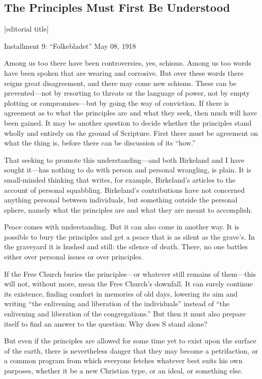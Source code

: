 

\subsection{The Principles Must First Be Understood} 
[editorial title]

Installment 9: “Folkebladet” May 08, 1918

Among us too there have been controversies, yes, schisms. Among us too words have been spoken that are wearing and corrosive. But over these words there reigns great disagreement, and there may come new schisms. These can be prevented—not by resorting to threats or the language of power, not by empty plotting or compromises—but by going the way of conviction. If there is agreement as to what the principles are and what they seek, then much will have been gained. It may be another question to decide whether the principles stand wholly and entirely on the ground of Scripture. First there must be agreement on what the thing is, before there can be discussion of its “how.”

That seeking to promote this understanding—and both Birkeland and I have sought it—has nothing to do with person and personal wrangling, is plain. It is small-minded thinking that writes, for example, Birkeland’s articles to the account of personal squabbling. Birkeland’s contributions have not concerned anything personal between individuals, but something outside the personal sphere, namely what the principles are and what they are meant to accomplish.

Peace comes with understanding. But it can also come in another way. It is possible to bury the principles and get a peace that is as silent as the grave’s. In the graveyard it is hushed and still: the silence of death. There, no one battles either over personal issues or over principles.

If the Free Church buries the principles—or whatever still remains of them—this will not, without more, mean the Free Church’s downfall. It can surely continue its existence, finding comfort in memories of old days, lowering its aim and writing “the enlivening and liberation of the individuals” instead of “the enlivening and liberation of the congregations.” But then it must also prepare itself to find an answer to the question: Why does S stand alone?

But even if the principles are allowed for some time yet to exist upon the surface of the earth, there is nevertheless danger that they may become a petrifaction, or a common program from which everyone fetches whatever best suits his own purposes, whether it be a new Christian type, or an ideal, or something else.

